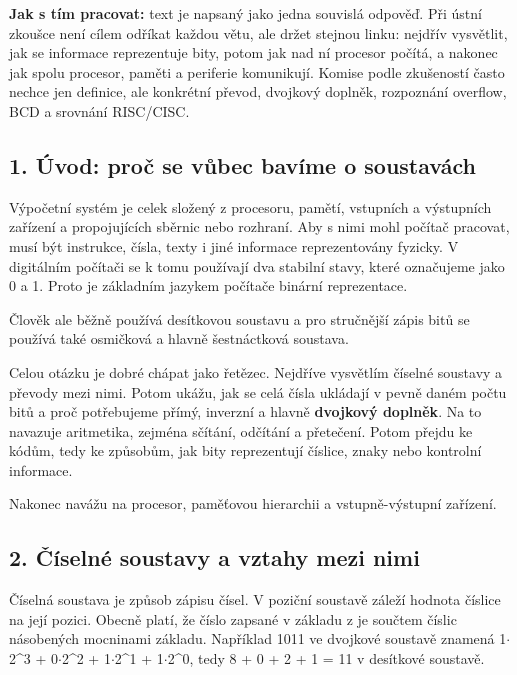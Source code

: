 \documentclass[11pt,a4paper]{article}
\newcommand{\itbox}[1]{\medskip\noindent\colorbox{black!6}{\parbox{\dimexpr\linewidth-2\fboxsep}{#1}}\medskip}
\begin{document}
\itbox{\textbf{Jak s tím pracovat:} text je napsaný jako jedna souvislá odpověď. Při ústní zkoušce není cílem odříkat každou větu, ale držet stejnou linku: nejdřív vysvětlit, jak se informace reprezentuje bity, potom jak nad ní procesor počítá, a nakonec jak spolu procesor, paměti a periferie komunikují. Komise podle zkušeností často nechce jen definice, ale konkrétní převod, dvojkový doplněk, rozpoznání overflow, BCD a srovnání RISC/CISC.}

\subsection*{1. Úvod: proč se vůbec bavíme o soustavách}

Výpočetní systém je celek složený z procesoru, pamětí, vstupních a výstupních zařízení a propojujících sběrnic nebo rozhraní. Aby s nimi mohl počítač pracovat, musí být instrukce, čísla, texty i jiné informace reprezentovány fyzicky. V digitálním počítači se k tomu používají dva stabilní stavy, které označujeme jako 0 a 1. Proto je základním jazykem počítače binární reprezentace.

Člověk ale běžně používá desítkovou soustavu a pro stručnější zápis bitů se používá také osmičková a hlavně šestnáctková soustava.

Celou otázku je dobré chápat jako řetězec. Nejdříve vysvětlím číselné soustavy a převody mezi nimi. Potom ukážu, jak se celá čísla ukládají v pevně daném počtu bitů a proč potřebujeme přímý, inverzní a hlavně \textbf{dvojkový doplněk}. Na to navazuje aritmetika, zejména sčítání, odčítání a přetečení. Potom přejdu ke kódům, tedy ke způsobům, jak bity reprezentují číslice, znaky nebo kontrolní informace.

Nakonec navážu na procesor, paměťovou hierarchii a vstupně-výstupní zařízení.

\subsection*{2. Číselné soustavy a vztahy mezi nimi}

Číselná soustava je způsob zápisu čísel. V poziční soustavě záleží hodnota číslice na její pozici. Obecně platí, že číslo zapsané v základu z je součtem číslic násobených mocninami základu. Například 1011 ve dvojkové soustavě znamená 1$\cdot$2\textasciicircum{}3 + 0$\cdot$2\textasciicircum{}2 + 1$\cdot$2\textasciicircum{}1 + 1$\cdot$2\textasciicircum{}0, tedy 8 + 0 + 2 + 1 = 11 v desítkové soustavě.
\end{document}
